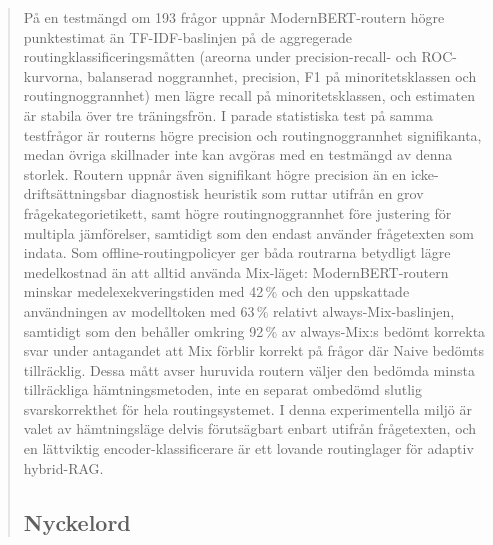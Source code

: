 \documentclass[english, bibtex]{kththesis}               %
\newcommand*{\generalExpl}[1]{\todo[inline]{#1}}
\newcommand*{\engExpl}[1]{\todo[inline, backgroundcolor=kth-lightgreen40]{#1}} %
\newcommand*{\sweExpl}[1]{\todo[inline, backgroundcolor=kth-lightblue40]{#1}}  %
\renewcommand\generalExpl[1]{}
\renewcommand\engExpl[1]{}
\renewcommand\sweExpl[1]{}
\numberwithin{listing}{chapter}
\begin{document}
\begin{abstract}
\begin{scontents}[store-env=abstracts,print-env=true]
På en testmängd om 193 frågor uppnår ModernBERT-routern högre punktestimat än TF-IDF-baslinjen på de aggregerade routingklassificeringsmåtten (areorna under precision-recall- och ROC-kurvorna, balanserad noggrannhet, precision, F1 på minoritetsklassen och routingnoggrannhet) men lägre recall på minoritetsklassen, och estimaten är stabila över tre träningsfrön. I parade statistiska test på samma testfrågor är routerns högre precision och routingnoggrannhet signifikanta, medan övriga skillnader inte kan avgöras med en testmängd av denna storlek. Routern uppnår även signifikant högre precision än en icke-driftsättningsbar diagnostisk heuristik som ruttar utifrån en grov frågekategorietikett, samt högre routingnoggrannhet före justering för multipla jämförelser, samtidigt som den endast använder frågetexten som indata. Som offline-routingpolicyer ger båda routrarna betydligt lägre medelkostnad än att alltid använda Mix-läget: ModernBERT-routern minskar medelexekveringstiden med 42\,\% och den uppskattade användningen av modelltoken med 63\,\% relativt always-Mix-baslinjen, samtidigt som den behåller omkring 92\,\% av always-Mix:s bedömt korrekta svar under antagandet att Mix förblir korrekt på frågor där Naive bedömts tillräcklig. Dessa mått avser huruvida routern väljer den bedömda minsta tillräckliga hämtningsmetoden, inte en separat ombedömd slutlig svarskorrekthet för hela routingsystemet. I denna experimentella miljö är valet av hämtningsläge delvis förutsägbart enbart utifrån frågetexten, och en lättviktig encoder-klassificerare är ett lovande routinglager för adaptiv hybrid-RAG.
\end{scontents}
\subsection*{Nyckelord}
\begin{scontents}[store-env=keywords,print-env=true]
\end{scontents}
\sweExpl{Nyckelord som beskriver innehållet i uppsatsen eller rapporten}
\end{abstract}
\cleardoublepage
{}


\engExpl{If you add the class option \texttt{includeExtraAbstracts} in your \texttt{docuemntclass}, then you can enable abstracts/summaries in a number of languages. Include those versions of abstracts that you need.}
\generalExpl{If you are an exchange student, use the relevant language or languages for abstracts for your home university, as this will often avoid the need for writing another thesis for your home university.}
\generalExpl{If you are fluent in other languages, feel free to add the abstracts in one or more of them.}
\end{document}
